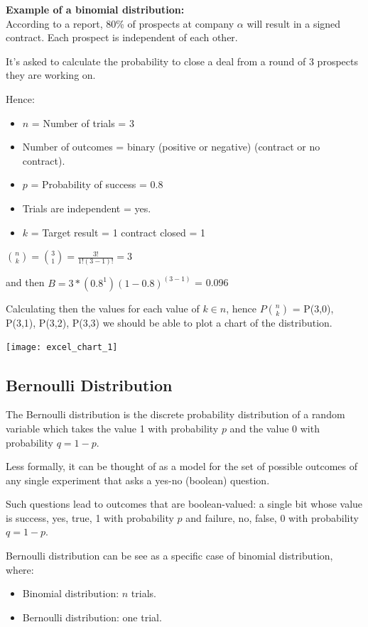 \documentclass{article}
\begin{document}
\textbf{Example of a binomial distribution:} \\

According to a report, 80\% of prospects at company $\alpha$ will result in a signed contract. Each prospect is independent of each other.

It's asked to calculate the probability to close a deal from a round of 3 prospects they are working on.

Hence:
\begin{itemize}
    \item $n$ = Number of trials = 3
    \item Number of outcomes = binary (positive or negative) (contract or no contract).
    \item $p$ = Probability of success = 0.8
    \item Trials are independent = yes.
    \item $k$ = Target result = 1 contract closed = 1
\end{itemize}

$ \displaystyle {\binom {n}{k}} = {\binom {3}{1}} = \frac{3!}{1!(3 - 1)!} = 3$

and then $B = 3 * (0.8^1)(1 - 0.8)^(3-1)$ = 0.096

Calculating then the values for each value of $k \in n$, hence $P\binom {n}{k}$ = P(3,0), P(3,1), P(3,2), P(3,3) we should be able to plot a chart of the distribution.


\texttt{[image: excel\_chart\_1]}

\subsection{Bernoulli Distribution}
The Bernoulli distribution is the discrete probability distribution of a random variable which takes the value 1 with probability $p$ and the value 0 with probability $q = 1 - p$. 

Less formally, it can be thought of as a model for the set of possible outcomes of any single experiment that asks a yes-no (boolean) question. 

Such questions lead to outcomes that are boolean-valued: a single bit whose value is success, yes, true, 1 with probability $p$ and failure, no, false, 0 with probability $q = 1 - p$. 

Bernoulli distribution can be see as a specific case of binomial distribution, where:
\begin{itemize}
    \item Binomial distribution: $n$ trials.
    \item Bernoulli distribution: one trial.
\end{itemize}
\end{document}
